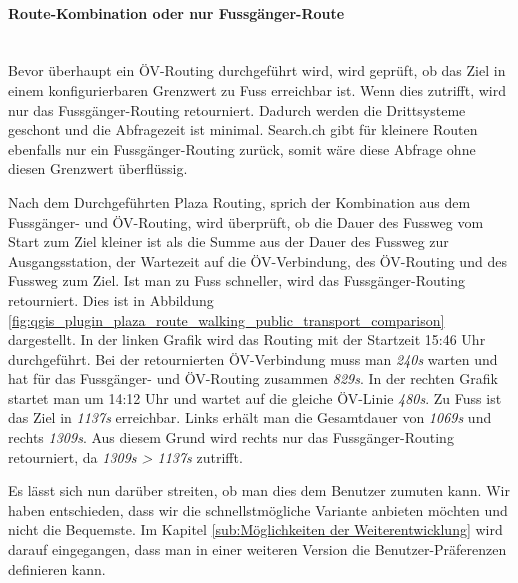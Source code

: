 \paragraph{Route-Kombination oder nur Fussgänger-Route}\label{impl:Route-Kombination oder nur Fussgänger-Route}~\\
Bevor überhaupt ein ÖV-Routing durchgeführt wird, wird geprüft, ob das Ziel in einem konfigurierbaren Grenzwert zu Fuss erreichbar ist. Wenn dies zutrifft, wird nur das Fussgänger-Routing retourniert. Dadurch werden die Drittsysteme geschont und die Abfragezeit ist minimal. Search.ch \cite{search_ch_route_api} gibt für kleinere Routen ebenfalls nur ein Fussgänger-Routing zurück, somit wäre diese Abfrage ohne diesen Grenzwert überflüssig.

Nach dem Durchgeführten Plaza Routing, sprich der Kombination aus dem Fussgänger- und ÖV-Routing, wird überprüft, ob die Dauer des Fussweg vom Start zum Ziel kleiner ist als die Summe aus der Dauer des Fussweg zur Ausgangsstation, der Wartezeit auf die ÖV-Verbindung, des ÖV-Routing und des Fussweg zum Ziel. Ist man zu Fuss schneller, wird das Fussgänger-Routing retourniert. Dies ist in Abbildung \ref{fig:qgis_plugin_plaza_route_walking_public_transport_comparison} dargestellt. In der linken Grafik wird das Routing mit der Startzeit 15:46 Uhr durchgeführt. Bei der retournierten ÖV-Verbindung muss man \emph{240s} warten und hat für das Fussgänger- und ÖV-Routing zusammen \emph{829s}.
In der rechten Grafik startet man um 14:12 Uhr und wartet auf die gleiche ÖV-Linie \emph{480s}. Zu Fuss ist das Ziel in \emph{1137s} erreichbar. Links erhält man die Gesamtdauer von \emph{1069s} und rechts \emph{1309s}.
Aus diesem Grund wird rechts nur das Fussgänger-Routing retourniert, da \emph{1309s > 1137s} zutrifft.

Es lässt sich nun darüber streiten, ob man dies dem Benutzer zumuten kann. Wir haben entschieden, dass wir die schnellstmögliche Variante anbieten möchten und nicht die Bequemste.
Im Kapitel \ref{sub:Möglichkeiten der Weiterentwicklung} wird darauf eingegangen, dass man in einer weiteren Version die Benutzer-Präferenzen definieren kann.


